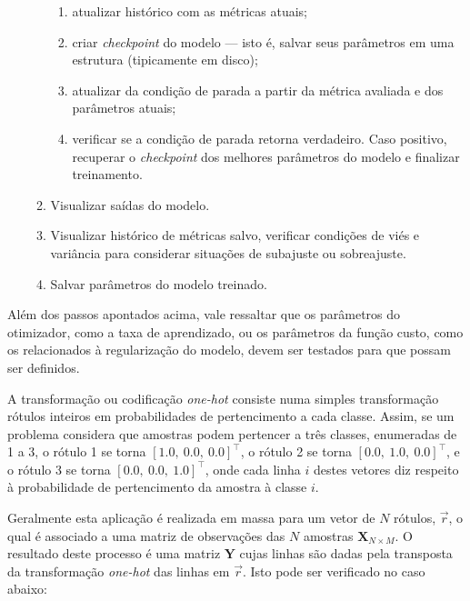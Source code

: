 \begin{enumerate}
\begin{enumerate}
\begin{enumerate}
              \item atualizar histórico com as métricas atuais;
              \item criar \textit{checkpoint} do modelo --- isto é, salvar seus parâmetros em uma estrutura (tipicamente em disco);
              \item atualizar da condição de parada a partir da métrica avaliada e dos parâmetros atuais;
              \item verificar se a condição de parada retorna verdadeiro. Caso positivo, recuperar o \textit{checkpoint} dos melhores parâmetros do modelo e finalizar treinamento.
            \end{enumerate}
          \item Visualizar saídas do modelo.
          \item Visualizar histórico de métricas salvo, verificar condições de viés e variância para considerar situações de subajuste ou sobreajuste.
          \item Salvar parâmetros do modelo treinado.
        \end{enumerate}
    \end{enumerate}
    
    Além dos passos apontados acima, vale ressaltar que os parâmetros do otimizador, como a taxa de aprendizado, ou os parâmetros da função custo, como os relacionados à regularização do modelo, devem ser testados para que possam ser definidos.


 \label{a:one_hot}

  A transformação ou codificação \textit{one-hot} consiste numa simples transformação rótulos inteiros em probabilidades de pertencimento a cada classe. Assim, se um problema considera que amostras podem pertencer a três classes, enumeradas de 1 a 3, o rótulo 1 se torna $[1.0,\ 0.0,\ 0.0]^\top$, o rótulo 2 se torna $[0.0,\ 1.0,\ 0.0]^\top$, e o rótulo 3 se torna $[0.0,\ 0.0,\ 1.0]^\top$, onde cada linha $i$ destes vetores diz respeito à probabilidade de pertencimento da amostra à classe $i$.

  Geralmente esta aplicação é realizada em massa para um vetor de $N$ rótulos, $\vec{r}$, o qual é associado a uma matriz de observações das $N$ amostras $\boldsymbol{X}_{N\times M}$. O resultado deste processo é uma matriz $\boldsymbol{Y}$ cujas linhas são dadas pela transposta da transformação \textit{one-hot} das linhas em $\vec{r}$. Isto pode ser verificado no caso abaixo:

